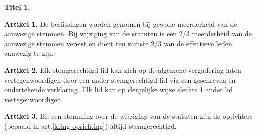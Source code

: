 \documentclass[a4paper,10pt]{article}
\theoremstyle{definition}
\newtheorem{titel}{\newline\Large Titel}
\newtheorem{artikel}{\large Artikel}
\newcommand{\ttextcr}{\hfill\newline}
\begin{document}
\begin{titel}
  \begin{artikel}\label{av-beslissen}\ttextcr
    De beslissingen worden genomen bij gewone meerderheid van de aanwezige stemmen.
    Bij wijziging van de statuten is een 2/3 meerderheid van de aanwezige stemmen vereist en dient ten minste 2/3 van de effectieve leden aanwezig te zijn.
  \end{artikel}

  \begin{artikel}\ttextcr
    Elk stemgerechtigd lid kan zich op de algemene vergadering laten vertegenwoordigen door een ander stemgerechtigd lid via een geschreven en ondertekende verklaring.
    Elk lid kan op dergelijke wijze slechts 1 ander lid vertegenwoordigen.
  \end{artikel}

  \begin{artikel}\ttextcr
    Bij een stemming over de wijziging van de statuten zijn de oprichters (bepaald in art.\ref{kring-oprichting}) altijd stemgerechtigd.
  \end{artikel}


\end{titel}

\end{document}
